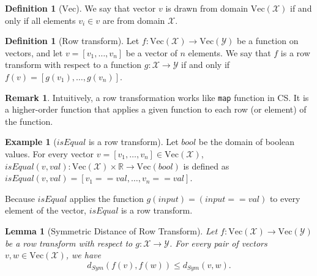 \documentclass[11pt,a4paper]{article}
\newtheorem{lemma}[theorem]{Lemma}
\theoremstyle{definition}
\newtheorem{remark}[theorem]{Remark}
\newtheorem{definition}[theorem]{Definition}
\newtheorem{example}[theorem]{Example}
\newcommand{\Vect}{\mathrm{Vec}}
\begin{document}
\begin{definition}[$\Vect$]
    We say that vector $v$ is drawn from domain $\Vect(\mathcal{X})$ if and only if all elements $v_i\in v$ are from domain $\mathcal{X}$.
\end{definition}

\begin{definition}[Row transform]
Let $f: \Vect(\mathcal{X})\rightarrow \Vect(\mathcal{Y})$ be a function on vectors, and let $v = [v_1,\ldots,v_n]$ be a vector of $n$ elements. We say that $f$ is a row transform with respect to a function $g:\mathcal{X}\rightarrow\mathcal{Y}$ if and only if $f(v) = [g(v_1), \ldots, g(v_n)]$.
\end{definition}

\begin{remark}
    Intuitively, a row transformation works like \texttt{map} function in CS. It is a higher-order function that applies a given function to each row (or element) of the function. 
\end{remark}

\begin{example}[$isEqual$ is a row transform]
Let $bool$ be the domain of boolean values. For every vector $v = [v_1,\ldots,v_n]\in\Vect(\mathcal{X})$, $isEqual(v,val): \Vect(\mathcal{X})\times \mathbb{R} \rightarrow \Vect(bool)$ is defined as $isEqual(v,val) = [v_1 == val, \ldots, v_n == val]$.

Because $isEqual$ applies the function $g(input)  = (input == val)$ to every element of the vector, $isEqual$ is a row transform.
\end{example}

\begin{lemma}[Symmetric Distance of Row Transform]
Let $f:\Vect(\mathcal{X})\rightarrow \Vect(\mathcal{Y})$ be a row transform with respect to $g:\mathcal{X}\rightarrow\mathcal{Y}$. For every pair of vectors $v, w\in \Vect(\mathcal{X})$, we have
$$d_{Sym}(f(v), f(w)) \leq d_{Sym}(v, w).$$
\end{lemma}
\end{document}
